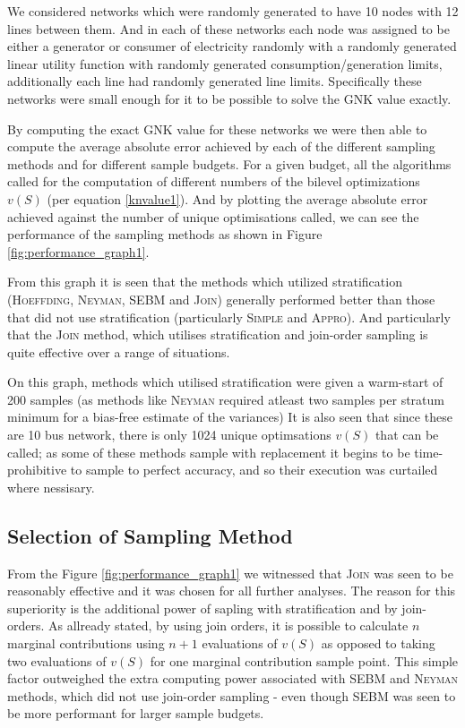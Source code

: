 We considered networks which were randomly generated to have 10 nodes with 12 lines between them.
And in each of these networks each node was assigned to be either a generator or consumer of electricity randomly with a randomly generated linear utility function with randomly generated consumption/generation limits, additionally each line had randomly generated line limits.
Specifically these networks were small enough for it to be possible to solve the GNK value exactly.

By computing the exact GNK value for these networks we were then able to compute the average absolute error achieved by each of the different sampling methods and for different sample budgets.
For a given budget, all the algorithms called for the computation of different numbers of the bilevel optimizations $v(S)$ (per equation \ref{knvalue1}).
And by plotting the average absolute error achieved against the number of unique optimisations called, we can see the performance of the sampling methods as shown in Figure \ref{fig:performance_graph1}.

From this graph it is seen that the methods which utilized stratification (\textsc{Hoeffding}, \textsc{Neyman}, \textsc{SEBM} and \textsc{Join})  generally performed better than those that did not use stratification (particularly \textsc{Simple} and \textsc{Appro}).
And particularly that the \textsc{Join} method, which utilises stratification and join-order sampling is quite effective over a range of situations.

On this graph, methods which utilised stratification were given a warm-start of 200 samples (as methods like \textsc{Neyman} required atleast two samples per stratum minimum for a bias-free estimate of the variances)
It is also seen that since these are 10 bus network, there is only 1024 unique optimsations $v(S)$ that can be called; as some of these methods sample with replacement it begins to be time-prohibitive to sample to perfect accuracy, and so their execution was curtailed where nessisary.

\subsection{Selection of Sampling Method}

From the Figure \ref{fig:performance_graph1} we witnessed that \textsc{Join} was seen to be reasonably effective and it was chosen for all further analyses.
The reason for this superiority is the additional power of sapling with stratification and by join-orders.
As allready stated, by using join orders, it is possible to calculate $n$ marginal contributions using $n+1$ evaluations of $v(S)$ as opposed to taking two evaluations of $v(S)$ for one marginal contribution sample point.
This simple factor outweighed the extra computing power associated with \textsc{SEBM} and \textsc{Neyman} methods, which did not use join-order sampling - even though SEBM was seen to be more performant for larger sample budgets.

